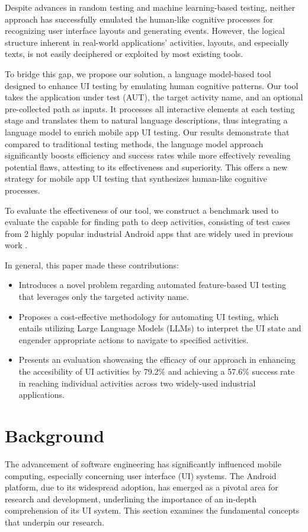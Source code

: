 \documentclass[conference]{IEEEtran}
\begin{document}
Despite advances in random testing and machine learning-based testing, neither approach has successfully emulated the human-like cognitive processes for recognizing user interface layouts and generating events. However, the logical structure inherent in real-world applications' activities, layouts, and especially texts, is not easily deciphered or exploited by most existing tools.

To bridge this gap, we propose our solution, a language model-based tool designed to enhance UI testing by emulating human cognitive patterns. Our tool takes the application under test (AUT), the target activity name, and an optional pre-collected path as inputs. It processes all interactive elements at each testing stage and translates them to natural language descriptions, thus integrating a language model to enrich mobile app UI testing.
Our results demonstrate that compared to traditional testing methods, the language model approach significantly boosts efficiency and success rates while more effectively revealing potential flaws, attesting to its effectiveness and superiority. This offers a new strategy for mobile app UI testing that synthesizes human-like cognitive processes.

To evaluate the effectiveness of our tool, we construct a benchmark used to evaluate the capable for finding path to deep activities, consisting of test cases from 2 highly popular industrial Android apps that are widely used in previous work \cite{dong_time-travel_2020}\cite{Wang:2018:ESA:3238147.3240465}\cite{vet-paper}\cite{toller-paper}.

In general, this paper made these contributions:
\begin{itemize}
\item Introduces a novel problem regarding automated feature-based UI testing that leverages only the targeted activity name.
\item Proposes a cost-effective methodology for automating UI testing, which entails utilizing Large Language Models (LLMs) to interpret the UI state and engender appropriate actions to navigate to specified activities.
\item Presents an evaluation showcasing the efficacy of our approach in enhancing the accesibility of UI activities by 79.2\% and achieving a 57.6\% success rate in reaching individual activities across two widely-used industrial applications.


\end{itemize}

\section{Background}
The advancement of software engineering has significantly influenced mobile computing, especially concerning user interface (UI) systems. The Android platform, due to its widespread adoption, has emerged as a pivotal area for research and development, underlining the importance of an in-depth comprehension of its UI system. This section examines the fundamental concepts that underpin our research.
\end{document}
